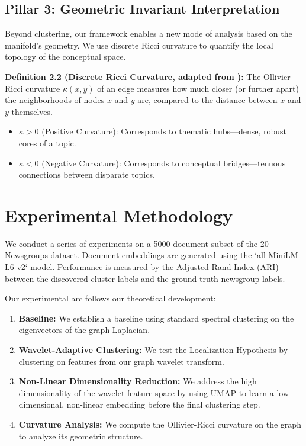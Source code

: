 \documentclass[11pt, letterpaper]{article}
\begin{document}
\subsection{Pillar 3: Geometric Invariant Interpretation}
Beyond clustering, our framework enables a new mode of analysis based on the manifold's geometry. We use discrete Ricci curvature to quantify the local topology of the conceptual space.

\textbf{Definition 2.2 (Discrete Ricci Curvature, adapted from \cite{ollivier2009ricci}):} The Ollivier-Ricci curvature $\kappa(x, y)$ of an edge measures how much closer (or further apart) the neighborhoods of nodes $x$ and $y$ are, compared to the distance between $x$ and $y$ themselves.
\begin{itemize}
    \item $\kappa > 0$ (Positive Curvature): Corresponds to thematic hubs—dense, robust cores of a topic.
    \item $\kappa < 0$ (Negative Curvature): Corresponds to conceptual bridges—tenuous connections between disparate topics.
\end{itemize}

\section{Experimental Methodology}
We conduct a series of experiments on a 5000-document subset of the 20 Newsgroups dataset. Document embeddings are generated using the `all-MiniLM-L6-v2` model. Performance is measured by the Adjusted Rand Index (ARI) between the discovered cluster labels and the ground-truth newsgroup labels.

Our experimental arc follows our theoretical development:
\begin{enumerate}
    \item \textbf{Baseline:} We establish a baseline using standard spectral clustering on the eigenvectors of the graph Laplacian.
    \item \textbf{Wavelet-Adaptive Clustering:} We test the Localization Hypothesis by clustering on features from our graph wavelet transform.
    \item \textbf{Non-Linear Dimensionality Reduction:} We address the high dimensionality of the wavelet feature space by using UMAP to learn a low-dimensional, non-linear embedding before the final clustering step.
    \item \textbf{Curvature Analysis:} We compute the Ollivier-Ricci curvature on the graph to analyze its geometric structure.
\end{enumerate}
\end{document}

